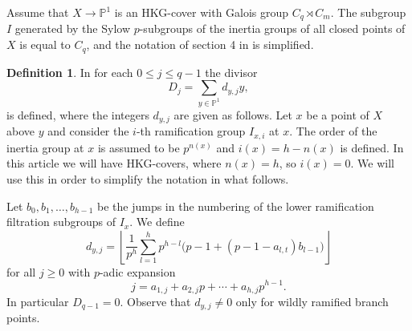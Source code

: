\documentclass[11pt,letterpaper]{amsart}
\theoremstyle{definition}
\newtheorem{definition}[theorem]{Definition}
\newcommand{\lf}{\left\lfloor}
\newcommand{\rf}{\right\rfloor}
\begin{document}
Assume that $X\rightarrow \mathbb{P}^1$ is an HKG-cover with Galois group $C_q \rtimes C_m$. The  subgroup $I$ generated by the Sylow $p$-subgroups of the inertia groups of all closed points of $X$ is equal to $C_q$, {and the notation of section 4 in \cite{MR4130074} is simplified.} 
\begin{definition}
\label{define-Dj}
In \cite{MR4130074} for 
each $0\leq j \leq q-1$ the divisor 
\[
D_j=\sum_{y\in \mathbb{P}^1} d_{y,j} y,
\]
is defined,
where the integers $d_{y,j}$ are given as follows.
Let $x$ be a point of $X$ above  $y$ and consider the $i$-th ramification group $I_{x,i}$ at $x$. 
The order of the inertia group at $x$ is assumed to be $p^{n(x)}$ and  $i(x)=h-n(x)$ is defined. In this article we will have HKG-covers, where 
$n(x)=h$, so $i(x)=0$. We will use this in order to simplify the notation in what follows. 

Let $b_0,b_1,\ldots,b_{h-1}$ be the jumps in the numbering of the lower ramification filtration subgroups of $I_x$.
 We define
\[
d_{y,j}=
\lf
\frac{1}{p^{h}} \sum_{l=1}^{h}
p^{h-l} 
\big(
p-1+ (p-1-a_{l,t})b_{l-1}
\big)
\rf 
\]  
for all $j\geq 0$ 
with $p$-adic expansion 
\[
j=a_{1,j}+a_{2,j}p+ \cdots+ a_{h,j}p^{h-1}.
\]
 In particular $D_{q-1}=0$. Observe that $d_{y,j}\neq 0$ only for  wildly ramified branch points.   

\end{definition}

\end{document}
